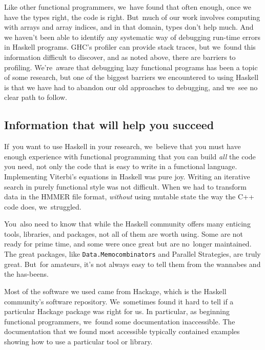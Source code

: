 \documentclass[preprint,nonatbib,blockstyle,nocopyrightspace,times]{sigplanconf}
\newcommand\seclabel[1]{\label{sec:#1}}
\begin{document}
Like other functional programmers, we~have found that often enough,
once we have the types right, the code is right.
But~much of our work involves computing with arrays and array indices,
and in that domain, types don't help much.
And we haven't been able to identify any systematic way of debugging
run-time errors in Haskell programs.
GHC's profiler can provide stack traces, but we~found this information
difficult to discover, and as noted above,
there are barriers to profiling.
We're~aware that debugging lazy functional programs has been a topic
of some research,
but one of the biggest barriers we encountered to using Haskell is
that we have had to abandon our old approaches to debugging,
and we~see no clear path to follow.


\subsection{Information that will help you succeed}

If~you want to use Haskell in your research, we~believe that you must
have enough experience with functional programming that you can build
\emph{all} the code you need, not only the code that is easy to write
in a functional language.
Implementing Viterbi's equations in Haskell was pure joy.
Writing an iterative search in purely functional style was not
difficult.
When we had to transform data in the HMMER file format, \emph{without}
using mutable state the way the C++ code does, we~struggled.

\seclabel{penumbra}

You~also need to know that while the Haskell community offers many
enticing tools, libraries, and packages,
not all of them are worth using.
Some are not ready for prime time, and some were once great but are
no~longer maintained.
The great packages, like \texttt{Data.Memocombinators} and Parallel
Strategies, are truly great.
But~for amateurs, it's not always easy to tell them from the wannabes
and the has-beens.

Most of the software we used came from Hackage, which is the Haskell
community's software repository.
We~sometimes found it hard to tell
if a particular Hackage package was right for us.
In particular, as beginning 
functional programmers, we~found some documentation inaccessible.
The documentation that we found most accessible typically contained
examples showing how to use a particular tool or library.
\end{document}
